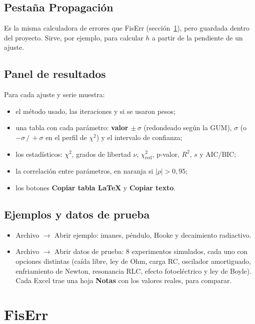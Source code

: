 \documentclass[11pt,a4paper]{article}
\newcommand{\boton}[1]{\textsf{\bfseries #1}}
\newcommand{\menu}[1]{\textsf{#1}}
\begin{document}
\subsection{Pestaña Propagación}

Es la misma calculadora de errores que FisErr (sección~\ref{sec:fiserr}), pero guardada dentro del proyecto. Sirve, por ejemplo, para calcular $h$ a partir de la pendiente de un ajuste.

\subsection{Panel de resultados}

Para cada ajuste y serie muestra:
\begin{itemize}
  \item el método usado, las iteraciones y si se usaron pesos;
  \item una tabla con cada parámetro: \textbf{valor $\pm\,\sigma$} (redondeado según la GUM), $\sigma$ (o $-\sigma\,/\,{+}\sigma$ en el perfil de $\chi^2$) y el intervalo de confianza;
  \item los estadísticos: $\chi^2$, grados de libertad $\nu$, $\chi^2_{\text{red}}$, p-valor, $R^2$, $s$ y AIC/BIC;
  \item la correlación entre parámetros, en naranja si $|\rho| > 0{,}95$;
  \item los botones \boton{Copiar tabla LaTeX} y \boton{Copiar texto}.
\end{itemize}

\subsection{Ejemplos y datos de prueba}

\begin{itemize}
  \item \menu{Archivo $\rightarrow$ Abrir ejemplo}: imanes, péndulo, Hooke y decaimiento radiactivo.
  \item \menu{Archivo $\rightarrow$ Abrir datos de prueba}: 8 experimentos simulados, cada uno con opciones distintas (caída libre, ley de Ohm, carga RC, oscilador amortiguado, enfriamiento de Newton, resonancia RLC, efecto fotoeléctrico y ley de Boyle). Cada Excel trae una hoja \textbf{Notas} con los valores reales, para comparar.
\end{itemize}
\fi

\section{FisErr}\label{sec:fiserr}
\end{document}
